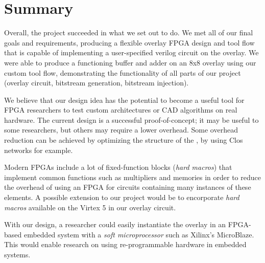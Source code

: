 \section{Summary} %

Overall, the project succeeded in what we set out to do.
We met all of our final goals and requirements, producing a flexible overlay FPGA design and tool flow that is capable of implementing a user-specified verilog circuit on the overlay.
We were able to produce a functioning buffer and adder on an 8x8 overlay using our custom tool flow, demonstrating the functionality of all parts of our project (overlay circuit, bitstream generation, bitstream injection).

We believe that our design idea has the potential to become a useful tool for FPGA researchers to test custom architectures or CAD algorithms on real hardware.
The current design is a successful proof-of-concept; it may be useful to some researchers, but others may require a lower overhead.
Some overhead reduction can be achieved by optimizing the structure of the \overlay, by using Clos networks for example.

Modern FPGAs include a lot of fixed-function blocks (\emph{hard macros}) that implement common functions such as multipliers and memories in order to reduce the overhead of using an FPGA for circuits containing many instances of these elements.
A possible extension to our project would be to encorporate \emph{hard macros} available on the Virtex 5 in our overlay circuit.

With our \overlay design, a researcher could easily instantiate the overlay in an FPGA-based embedded system with a \emph{soft microprocessor} such as Xilinx's MicroBlaze.
This would enable research on using re-programmable hardware in embedded systems.



